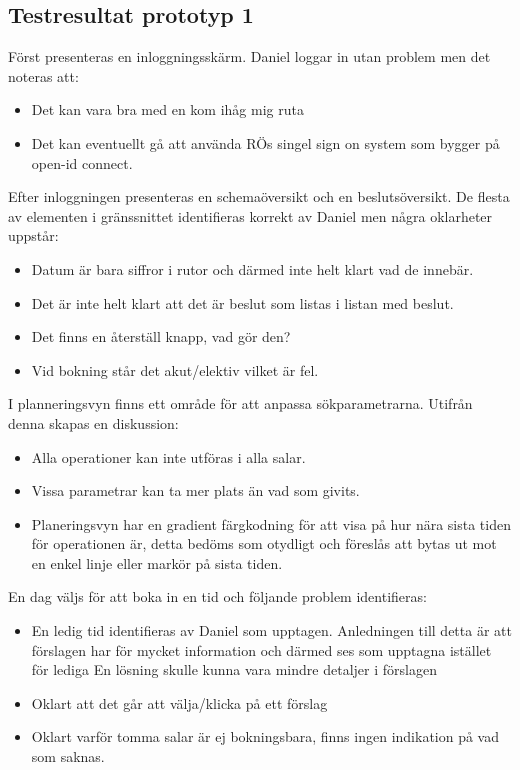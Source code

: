 \subsection{Testresultat prototyp 1}
Först presenteras en inloggningsskärm. Daniel loggar in utan problem men det noteras att:
\begin{itemize}
  \item Det kan vara bra med en kom ihåg mig ruta
  \item Det kan eventuellt gå att använda RÖs singel sign on system som bygger på open-id connect.
\end{itemize}
Efter inloggningen presenteras en schemaöversikt och en beslutsöversikt. De flesta av elementen i gränssnittet identifieras korrekt av Daniel men några oklarheter uppstår:
\begin{itemize}
\item Datum är bara siffror i rutor och därmed inte helt klart vad de innebär.
\item Det är inte helt klart att det är beslut som listas i listan med beslut.
\item Det finns en återställ knapp, vad gör den?
\item Vid bokning står det akut/elektiv vilket är fel.
\end{itemize}
I planneringsvyn finns ett område för att anpassa sökparametrarna. Utifrån denna skapas en diskussion:
\begin{itemize}
\item Alla operationer kan inte utföras i alla salar.
\item Vissa parametrar kan ta mer plats än vad som givits.
\item Planeringsvyn har en gradient färgkodning för att visa på hur nära sista tiden för operationen är, detta bedöms som otydligt och föreslås att bytas ut mot en enkel linje eller markör på sista tiden.
\end{itemize}

En dag väljs för att boka in en tid och följande problem identifieras: \\
\begin{itemize}
\item En ledig tid identifieras av Daniel som upptagen. Anledningen till detta är att förslagen har för mycket information och därmed ses som upptagna istället för lediga
En lösning skulle kunna vara mindre detaljer i förslagen
\item Oklart att det går att välja/klicka på ett förslag
\item Oklart varför tomma salar är ej bokningsbara, finns ingen indikation på vad som saknas.
\end{itemize}

